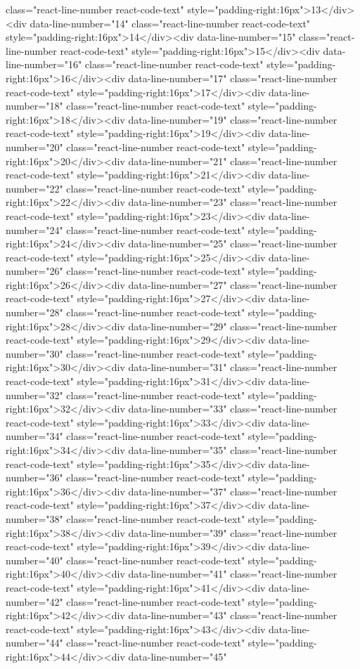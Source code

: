 {{{{{{{class="react-line-number react-code-text" style="padding-right:16px">13</div><div data-line-number="14" class="react-line-number react-code-text" style="padding-right:16px">14</div><div data-line-number="15" class="react-line-number react-code-text" style="padding-right:16px">15</div><div data-line-number="16" class="react-line-number react-code-text" style="padding-right:16px">16</div><div data-line-number="17" class="react-line-number react-code-text" style="padding-right:16px">17</div><div data-line-number="18" class="react-line-number react-code-text" style="padding-right:16px">18</div><div data-line-number="19" class="react-line-number react-code-text" style="padding-right:16px">19</div><div data-line-number="20" class="react-line-number react-code-text" style="padding-right:16px">20</div><div data-line-number="21" class="react-line-number react-code-text" style="padding-right:16px">21</div><div data-line-number="22" class="react-line-number react-code-text" style="padding-right:16px">22</div><div data-line-number="23" class="react-line-number react-code-text" style="padding-right:16px">23</div><div data-line-number="24" class="react-line-number react-code-text" style="padding-right:16px">24</div><div data-line-number="25" class="react-line-number react-code-text" style="padding-right:16px">25</div><div data-line-number="26" class="react-line-number react-code-text" style="padding-right:16px">26</div><div data-line-number="27" class="react-line-number react-code-text" style="padding-right:16px">27</div><div data-line-number="28" class="react-line-number react-code-text" style="padding-right:16px">28</div><div data-line-number="29" class="react-line-number react-code-text" style="padding-right:16px">29</div><div data-line-number="30" class="react-line-number react-code-text" style="padding-right:16px">30</div><div data-line-number="31" class="react-line-number react-code-text" style="padding-right:16px">31</div><div data-line-number="32" class="react-line-number react-code-text" style="padding-right:16px">32</div><div data-line-number="33" class="react-line-number react-code-text" style="padding-right:16px">33</div><div data-line-number="34" class="react-line-number react-code-text" style="padding-right:16px">34</div><div data-line-number="35" class="react-line-number react-code-text" style="padding-right:16px">35</div><div data-line-number="36" class="react-line-number react-code-text" style="padding-right:16px">36</div><div data-line-number="37" class="react-line-number react-code-text" style="padding-right:16px">37</div><div data-line-number="38" class="react-line-number react-code-text" style="padding-right:16px">38</div><div data-line-number="39" class="react-line-number react-code-text" style="padding-right:16px">39</div><div data-line-number="40" class="react-line-number react-code-text" style="padding-right:16px">40</div><div data-line-number="41" class="react-line-number react-code-text" style="padding-right:16px">41</div><div data-line-number="42" class="react-line-number react-code-text" style="padding-right:16px">42</div><div data-line-number="43" class="react-line-number react-code-text" style="padding-right:16px">43</div><div data-line-number="44" class="react-line-number react-code-text" style="padding-right:16px">44</div><div data-line-number="45" }}}}}}}
